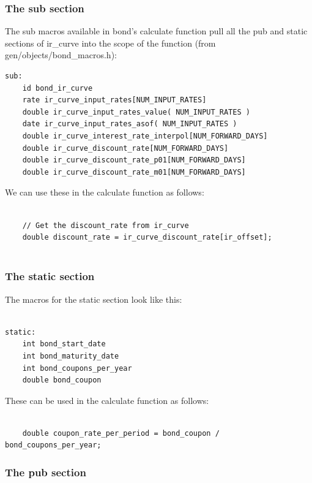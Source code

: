 \documentclass{report}
\begin{document}
\subsubsection{The sub section}

The sub macros available in bond's calculate function pull all the pub and static sections of ir_curve into the scope of the function (from gen/objects/bond_macros.h):

\begin{verbatim}
sub:
    id bond_ir_curve
    rate ir_curve_input_rates[NUM_INPUT_RATES]
    double ir_curve_input_rates_value( NUM_INPUT_RATES )
    date ir_curve_input_rates_asof( NUM_INPUT_RATES )
    double ir_curve_interest_rate_interpol[NUM_FORWARD_DAYS]
    double ir_curve_discount_rate[NUM_FORWARD_DAYS]
    double ir_curve_discount_rate_p01[NUM_FORWARD_DAYS]
    double ir_curve_discount_rate_m01[NUM_FORWARD_DAYS]
\end{verbatim}

We can use these in the calculate function as follows:


\begin{verbatim}

    // Get the discount_rate from ir_curve
    double discount_rate = ir_curve_discount_rate[ir_offset];


\end{verbatim}

\subsubsection{The static section}

The macros for the static section look like this:


\begin{verbatim}

static:
    int bond_start_date
    int bond_maturity_date
    int bond_coupons_per_year
    double bond_coupon

\end{verbatim}

These can be used in the calculate function as follows:

\begin{verbatim}

    double coupon_rate_per_period = bond_coupon / bond_coupons_per_year;

\end{verbatim}


\subsubsection{The pub section}
\end{document}
